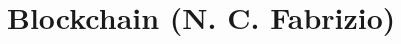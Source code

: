 




















































































































\chapter{Blockchain (N. C. Fabrizio)}

